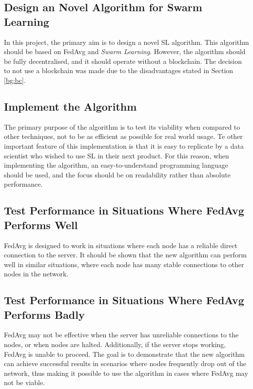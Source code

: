 \subsection{Design an Novel Algorithm for Swarm Learning}
In this project, the primary aim is to design a novel SL algorithm. This algorithm should be based on FedAvg and \emph{Swarm Learning}. However, the algorithm should be fully decentralised, and it should operate without a blockchain. The decision to not use a blockchain was made due to the disadvantages stated in Section \ref{bg:bc}.

\subsection{Implement the Algorithm}
The primary purpose of the algorithm is to test its viability when compared to other techniques, not to be as efficient as possible for real world usage. Te other important feature of this implementation is that it is easy to replicate by a data scientist who wished to use SL in their next product. For this reason, when implementing the algorithm, an easy-to-understand programming language should be used, and the focus should be on readability rather than absolute performance.

\subsection{Test Performance in Situations Where FedAvg Performs Well}
FedAvg is designed to work in situations where each node has a reliable direct connection to the server. It should be shown that the new algorithm can perform well in similar situations, where each node has many stable connections to other nodes in the network.

\subsection{Test Performance in Situations Where FedAvg Performs Badly}
FedAvg may not be effective when the server has unreliable connections to the nodes, or when nodes are halted. Additionally, if the server stops working, FedAvg is unable to proceed. The goal is to demonstrate that the new algorithm can achieve successful results in scenarios where nodes frequently drop out of the network, thus making it possible to use the algorithm in cases where FedAvg may not be viable.